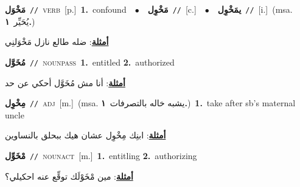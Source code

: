 \documentclass[10pt,a4paper,twoside]{article} %
\begin{document}
\begin{multicols}{2}
{\setlength\topsep{0pt}\textbf{\foreignlanguage{arabic}{مَخْوَل}}\ {\color{gray}\texttt{//}\color{black}}\ \textsc{verb}\ [p.]\ \textbf{1.}~confound\ \ $\bullet$\ \ \setlength\topsep{0pt}\textbf{\foreignlanguage{arabic}{مَخْوِل}}\ {\color{gray}\texttt{//}\color{black}}\ [c.]\ \ $\bullet$\ \ \setlength\topsep{0pt}\textbf{\foreignlanguage{arabic}{يمَخْوِل}}\ {\color{gray}\texttt{//}\color{black}}\ [i.]\ \color{gray}(msa. \foreignlanguage{arabic}{يُحَيِّر}~\foreignlanguage{arabic}{\textbf{١.}})\color{black}\  \begin{flushright}\color{gray}\foreignlanguage{arabic}{\textbf{\underline{\foreignlanguage{arabic}{أمثلة}}}: ضله طالع نازل مَخْوَلنِي}\end{flushright}\color{black}} \vspace{2mm}

{\setlength\topsep{0pt}\textbf{\foreignlanguage{arabic}{مُخَوَّل}}\ {\color{gray}\texttt{//}\color{black}}\ \textsc{noun\textunderscore pass}\ \textbf{1.}~entitled  \textbf{2.}~authorized\  \begin{flushright}\color{gray}\foreignlanguage{arabic}{\textbf{\underline{\foreignlanguage{arabic}{أمثلة}}}: أنا مش مُخَوَّل أحكي عن حد}\end{flushright}\color{black}} \vspace{2mm}

{\setlength\topsep{0pt}\textbf{\foreignlanguage{arabic}{مِخْوِل}}\ {\color{gray}\texttt{//}\color{black}}\ \textsc{adj}\ [m.]\ \color{gray}(msa. \foreignlanguage{arabic}{يشبه خاله بالتصرفات}~\foreignlanguage{arabic}{\textbf{١.}})\color{black}\ \textbf{1.}~take after sb's maternal uncle\  \begin{flushright}\color{gray}\foreignlanguage{arabic}{\textbf{\underline{\foreignlanguage{arabic}{أمثلة}}}: ابنِك مِخْوِل عشان هيك ببحلق بالنساوين}\end{flushright}\color{black}} \vspace{2mm}

{\setlength\topsep{0pt}\textbf{\foreignlanguage{arabic}{مْخَوِّل}}\ {\color{gray}\texttt{//}\color{black}}\ \textsc{noun\textunderscore act}\ [m.]\ \textbf{1.}~entitling  \textbf{2.}~authorizing\  \begin{flushright}\color{gray}\foreignlanguage{arabic}{\textbf{\underline{\foreignlanguage{arabic}{أمثلة}}}: مين مْخَوْلَك توقِّع عنه احكيلي؟}\end{flushright}\color{black}} \vspace{2mm}


\end{multicols}
\end{document}
